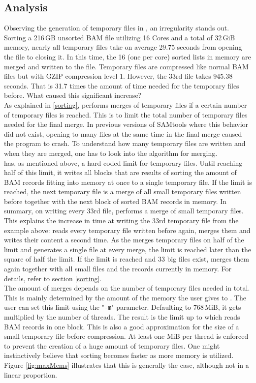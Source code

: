 \subsection{Analysis}
Observing the generation of temporary files in \sort, an irregularity stands out. Sorting a 216\,GB unsorted BAM file utilizing 16 Cores and a total of 32\,GiB memory, nearly all temporary files take on average 29.75 seconds from opening the file to closing it. In this time, the 16 (one per core) sorted lists in memory are merged and written to the file. Temporary files are compressed like normal BAM files but with GZIP compression level 1. However, the 33rd file takes 945.38 seconds. That is 31.7 times the amount of time needed for the temporary files before. What caused this significant increase? \\
As explained in \ref{sorting}, \sort performs merges of temporary files if a certain number of temporary files is reached. This is to limit the total number of temporary files needed for the final merge. In previous versions of SAMtools where this behavior did not exist, opening to many files at the same time in the final merge caused the program to crash.
To understand how many temporary files are written and when they are merged, one has to look into the algorithm for merging. \\
\sort has, as mentioned above, a hard coded limit for temporary files. Until reaching half of this limit, it writes all blocks that are results of sorting the amount of BAM records fitting into memory at once to a single temporary file. If the limit is reached, the next temporary file is a merge of all small temporary files written before together with the next block of sorted BAM records in memory. In summary, on writing every 33rd file, \sort performs a merge of small temporary files. This explains the increase in time at writing the 33rd temporary file from the example above: \sort reads every temporary file written before again, merges them and writes their content a second time. As the \sort merges temporary files on half of the limit and generates a single file at every merge, the limit is reached later than the square of half the limit. If the limit is reached and 33 big files exist, \sort merges them again together with all small files and the records currently in memory. For details, refer to section \ref{sorting}. \\
The amount of merges depends on the number of temporary files needed in total. This is mainly determined by the amount of the memory the user gives to \sort. The user can set this limit using the "\texttt{-m}" parameter. Defaulting to 768\,MiB, it gets multiplied by the number of threads. The result is the limit up to which \sort reads BAM records in one block. This is also a good approximation for the size of a small temporary file before compression. At least one MiB per thread is enforced to prevent the creation of a huge amount of temporary files. One might instinctively believe that sorting becomes faster as more memory is utilized. Figure \ref{fig:maxMems} illustrates that this is generally the case, although not in a linear proportion.
